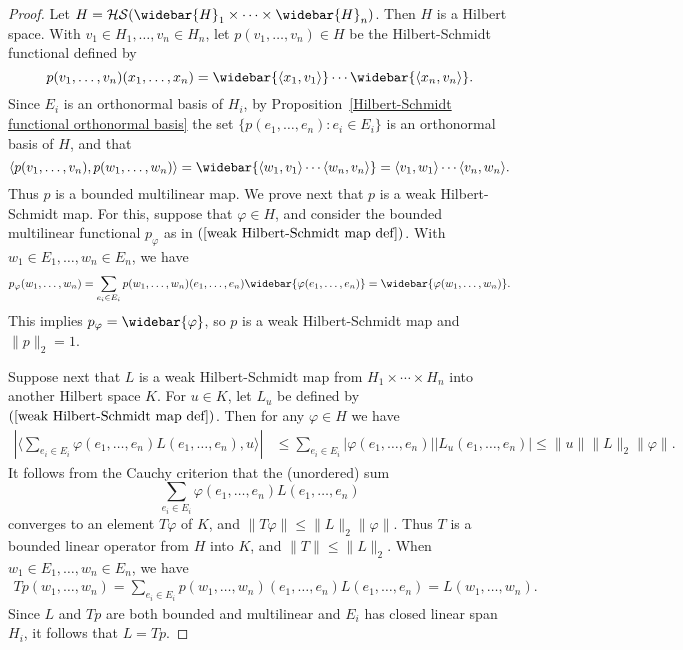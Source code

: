 \begin{proof}
Let $H=\mathcal{HS}(\widebar{H}_1\times\cdots\times\widebar{H}_n)$. Then $H$ is a Hilbert space. With $v_1\in H_1,\dots,v_n\in H_n$, let $p(v_1,\dots,v_n)\in H$ be the Hilbert-Schmidt functional defined by
\[p(v_1,\dots,v_n)(x_1,\dots,x_n)=\widebar{\langle x_1,v_1\rangle}\cdots\widebar{\langle x_n,v_n\rangle}.\]
Since $E_i$ is an orthonormal basis of $H_i$, by Proposition~\ref{Hilbert-Schmidt functional orthonormal basis} the set $\{p(e_1,\dots,e_n):e_i\in E_i\}$ is an orthonormal basis of $H$, and that
\[\langle p(v_1,\dots,v_n),p(w_1,\dots,w_n)\rangle=\widebar{\langle w_1,v_1\rangle\cdots\langle w_n,v_n\rangle}=\langle v_1,w_1\rangle\cdots\langle v_n,w_n\rangle.\]
Thus $p$ is a bounded multilinear map. We prove next that $p$ is a weak Hilbert-Schmidt map. For this, suppose that $\varphi\in H$, and consider the bounded multilinear functional $p_\varphi$ as in $(\ref{weak Hilbert-Schmidt map def})$. With $w_1\in E_1,\dots,w_n\in E_n$, we have
\begin{align*}
p_\varphi(w_1,\dots,w_n)=\sum_{e_i\in E_i}p(w_1,\dots,w_n)(e_1,\dots,e_n)\widebar{\varphi(e_1,\dots,e_n)}=\widebar{\varphi(w_1,\dots,w_n)}.
\end{align*}
This implies $p_\varphi=\widebar{\varphi}$, so $p$ is a weak Hilbert-Schmidt map and $\|p\|_2=1$.\par
Suppose next that $L$ is a weak Hilbert-Schmidt map from $H_1\times\cdots\times H_n$ into another Hilbert space $K$. For $u\in K$, let $L_u$ be defined by $(\ref{weak Hilbert-Schmidt map def})$. Then for any $\varphi\in H$ we have
\begin{align*}
|\langle\sum_{e_i\in E_i}\varphi(e_1,\dots,e_n)L(e_1,\dots,e_n),u\rangle|&\leq\sum_{e_i\in E_i}|\varphi(e_1,\dots,e_n)||L_u(e_1,\dots,e_n)|\leq\|u\|\|L\|_2\|\varphi\|.
\end{align*}
It follows from the Cauchy criterion that the (unordered) sum
\[\sum_{e_i\in E_i}\varphi(e_1,\dots,e_n)L(e_1,\dots,e_n)\]
converges to an element $T\varphi$ of $K$, and $\|T\varphi\|\leq\|L\|_2\|\varphi\|$. Thus $T$ is a bounded linear operator from $H$ into $K$, and $\|T\|\leq\|L\|_2$. When $w_1\in E_1,\dots,w_n\in E_n$, we have
\begin{align*}
Tp(w_1,\dots,w_n)=\sum_{e_i\in E_i}p(w_1,\dots,w_n)(e_1,\dots,e_n)L(e_1,\dots,e_n)=L(w_1,\dots,w_n).
\end{align*}
Since $L$ and $Tp$ are both bounded and multilinear and $E_i$ has closed linear span $H_i$, it follows that $L=Tp$.\par

\end{proof}
